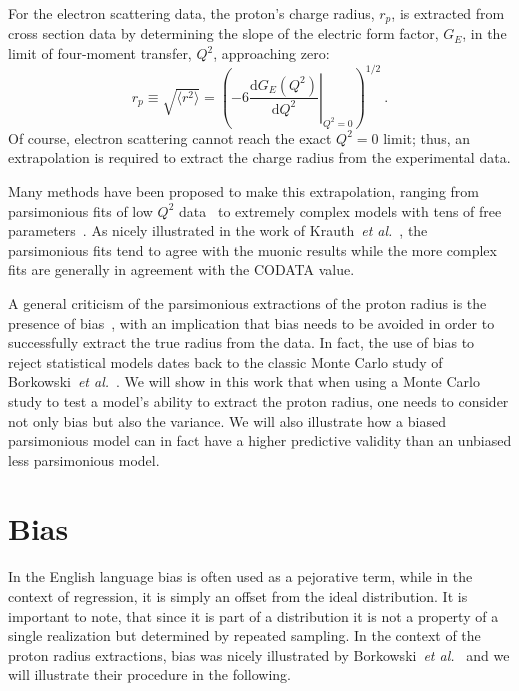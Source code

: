 \documentclass[10pt,aps,prc,twocolumn]{revtex4-1}
\begin{document}
For the electron scattering data, the proton's charge radius, $r_p$, is extracted from
cross section data by determining the slope of the electric form factor, $G_E$, in the
limit of four-moment transfer, $Q^2$, approaching zero: 
\begin{equation}
\label{eq:radius}
  r_p \equiv \sqrt{ \langle r^2 \rangle}
   = \left( -6  \left. \frac{\mathrm{d} G_E(Q^2)}{\mathrm{d}Q^2}
    \right|_{Q^{2}=0} \right)^{1/2} \>.
\end{equation}
Of course, electron scattering cannot reach the exact $Q^2 = 0$ limit; thus,
an extrapolation is required to extract the charge radius from the experimental data.

Many methods have been proposed to make this extrapolation,
ranging from parsimonious fits of low $Q^2$ data~\cite{Griffioen:2015hta,Horbatsch:2016ilr,Higinbotham:2015rja} 
to extremely complex models with tens of free parameters~\cite{Bernauer:2013tpr,Lee:2015jqa}.   
As nicely illustrated in the work of Krauth~{\it{et al.}}~\cite{Krauth:2017ijq}, the 
parsimonious fits tend to agree with the muonic results while the more complex fits 
are generally in agreement with the CODATA value.

A general criticism of the parsimonious extractions of the proton radius is the presence of bias~\cite{Sick:2017aor},
with an implication that bias needs to be avoided in order to successfully extract the true radius from the data.
In fact, the use of bias to reject statistical models dates back to the classic Monte Carlo 
study of Borkowski~{\it{et al.}}~\cite{Borkowski:1975}. 
We will show in this work that when using a Monte Carlo study to test a model's ability
to extract the proton radius, one needs to consider not only bias but also the variance.
We will also illustrate how a biased parsimonious model can in fact have a higher predictive 
validity than an unbiased less parsimonious model.

\section{Bias}

In the English language bias is often used as a pejorative term, while in the context of regression, it is simply
an offset from the ideal distribution.   It is important to note, that since it is part of a distribution it
is not a property of a single realization but determined by repeated sampling.    In the context of the proton 
radius extractions, bias was nicely illustrated by Borkowski~{\it{et al.}}~\cite{Borkowski:1975} and we will
illustrate their procedure in the following.
\end{document}

